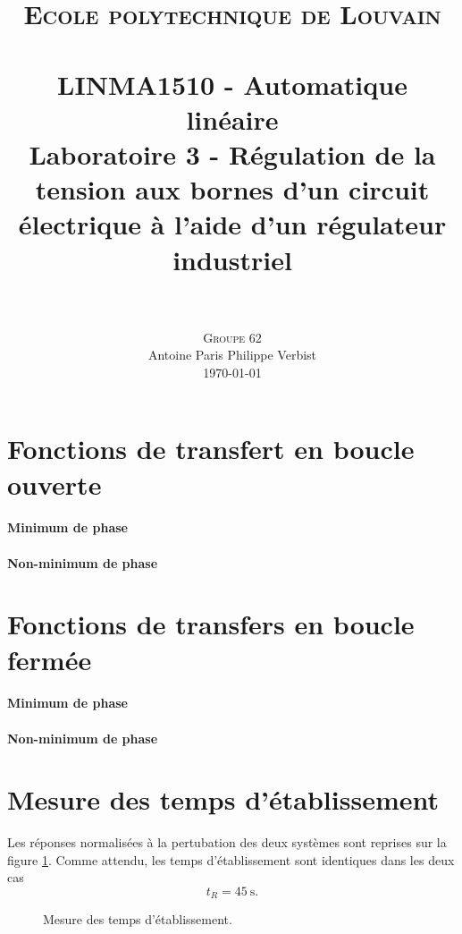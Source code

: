 \documentclass[frenchb, paper=a4, fontsize=11pt]{scrartcl}
\title{
		\usefont{OT1}{bch}{b}{n}
		\normalfont \normalsize \textsc{Ecole polytechnique de Louvain} \\ [25pt]
		\horrule{0.5pt} \\[0.4cm]
		\large LINMA1510 - Automatique linéaire\\
		\huge Laboratoire 3 - Régulation de la tension aux bornes d'un circuit
		électrique à l'aide d'un régulateur industriel \\
		\horrule{1.5pt} \\[0.5cm]
}
\author{
		\normalfont
		\textsc{Groupe 62}\\
      	Antoine Paris\hspace{0.6cm} Philippe Verbist \\	
       	\normalsize
        \today
}
\date{}
\numberwithin{equation}{section}					%
\numberwithin{figure}{section}					%
\numberwithin{table}{section}						%
\begin{document}
\maketitle

\section{Fonctions de transfert en boucle ouverte}
\paragraph{Minimum de phase}
\paragraph{Non-minimum de phase}

\section{Fonctions de transfers en boucle fermée}
\paragraph{Minimum de phase}
\paragraph{Non-minimum de phase}

\section{Mesure des temps d'établissement}
Les réponses normalisées à la pertubation des deux systèmes sont
reprises sur la figure \ref{fig:settling-time}. Comme attendu,
les temps d'établissement sont identiques dans les deux cas
\begin{equation}
	t_R = \SI{45}{\second}.
\end{equation}

\begin{figure}[ht]
	\centering
	
	\caption{Mesure des temps d'établissement.}
	\label{fig:settling-time}
\end{figure}
\end{document}
